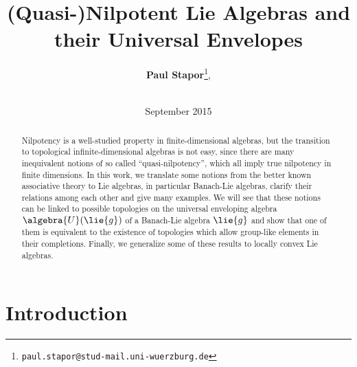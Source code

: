 \documentclass[
11pt,                          %
english                        %
]{article}
\title{(Quasi-)Nilpotent Lie Algebras and their Universal Envelopes}
\author{
  \textbf{Paul Stapor}\thanks{\texttt{paul.stapor@stud-mail.uni-wuerzburg.de}},
  \addtocounter{footnote}{2}
  \\[0.5cm]
  \chairXaddress
}
\date{September 2015}
\begin{document}
%
%

\maketitle

%
%

\begin{abstract}
    Nilpotency is a well-studied property in finite-dimensional algebras, but the 
    transition to topological infinite-dimensional algebras is not easy, since there 
    are many inequivalent notions of so called ``quasi-nilpotency'', which all imply 
    true nilpotency in finite dimensions. In this work, we translate some notions 
    from the better known associative theory to Lie algebras, in particular 
    Banach-Lie algebras, clarify their relations among each other and give many 
    examples. We will see that these notions can be linked to possible topologies on 
    the universal enveloping algebra $\algebra{U}(\lie{g})$ of a Banach-Lie algebra 
    $\lie{g}$ and show that one of them is equivalent to the existence of 
    topologies which allow group-like elements in their completions. Finally, we 
    generalize some of these results to locally convex Lie algebras.
\end{abstract}

\newpage

%
%

\tableofcontents

\newpage

%
%

\section{Introduction}
\label{sec:Introduction}
\end{document}
